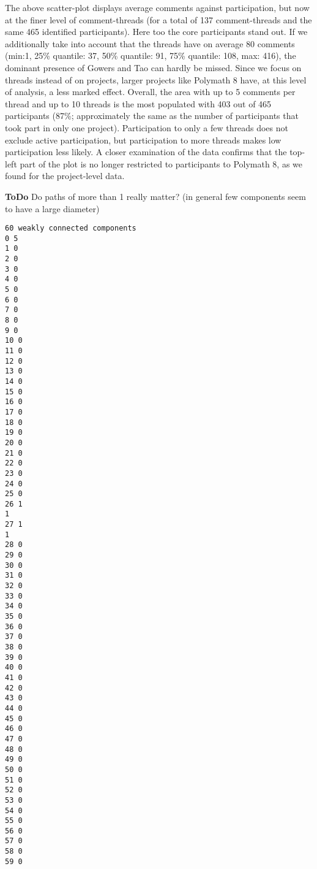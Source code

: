 \documentclass[article, floatfix, groupaddress, prb]{revtex4-1}
\begin{document}
    The above scatter-plot displays average comments against participation,
but now at the finer level of comment-threads (for a total of 137
comment-threads and the same 465 identified participants). Here too the
core participants stand out. If we additionally take into account that
the threads have on average 80 comments (min:1, 25\% quantile: 37, 50\%
quantile: 91, 75\% quantile: 108, max: 416), the dominant presence of
Gowers and Tao can hardly be missed. Since we focus on threads instead
of on projects, larger projects like Polymath 8 have, at this level of
analysis, a less marked effect. Overall, the area with up to 5 comments
per thread and up to 10 threads is the most populated with 403 out of
465 participants (87\%; approximately the same as the number of
participants that took part in only one project). Participation to only
a few threads does not exclude active participation, but participation
to more threads makes low participation less likely. A closer
examination of the data confirms that the top-left part of the plot is
no longer restricted to participants to Polymath 8, as we found for the
project-level data.

    \textbf{ToDo} Do paths of more than 1 really matter? (in general few
components seem to have a large diameter)



    \begin{Verbatim}[commandchars=\\\{\}]
60 weakly connected components
0 5
1 0
2 0
3 0
4 0
5 0
6 0
7 0
8 0
9 0
10 0
11 0
12 0
13 0
14 0
15 0
16 0
17 0
18 0
19 0
20 0
21 0
22 0
23 0
24 0
25 0
26 1
1
27 1
1
28 0
29 0
30 0
31 0
32 0
33 0
34 0
35 0
36 0
37 0
38 0
39 0
40 0
41 0
42 0
43 0
44 0
45 0
46 0
47 0
48 0
49 0
50 0
51 0
52 0
53 0
54 0
55 0
56 0
57 0
58 0
59 0

    \end{Verbatim}

    \begin{figure}
        \begin{center}\end{center}
        \caption{}
        \label{}
    \end{figure}
    
\end{document}
